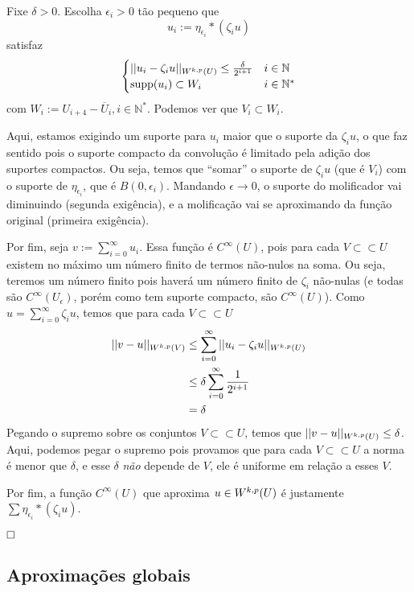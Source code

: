 \documentclass[a4paper, 11pt]{article}
\newcommand{\qed}{$\hfill\square$}
\newcommand{\N}{\mathbb{N}}
\newcommand{\e}{\epsilon}
\begin{document}
Fixe \( \delta>0\). Escolha \( \e_i>0 \) tão pequeno que \[ u_i := \eta_{\e_i} * \left(\zeta_iu\right) \] satisfaz \[ \begin{cases}
	||u_i - \zeta_iu||_{\sobolevdef} \leq \frac{\delta}{2^{i+1}} & i \in \N \\
	\text{supp}(u_i) \subset W_i & i \in \N^*
\end{cases} \] com \( W_i := U_{i+4} - \overline{U}_i, i \in \N^* \). Podemos ver que \( V_i \subset W_i \). 

Aqui, estamos exigindo um suporte para \( u_i \) maior que o suporte da \( \zeta_iu \), o que faz sentido pois o suporte compacto da convolução é limitado pela adição dos suportes compactos. Ou seja, temos que ``somar'' o suporte de \( \zeta_iu \) (que é \( V_i \)) com o suporte de \( \eta_{\e_i} \), que é \( B(0, \e_i) \). Mandando \( \e\rightarrow 0 \), o suporte do molificador vai diminuindo (segunda exigência), e a molificação vai se aproximando da função original (primeira exigência).

Por fim, seja $ v:=\sum_{i=0}^{\infty} u_i $. Essa função é \( C^\infty(U) \), pois para cada \( V \subset\subset U \) existem no máximo um número finito de termos não-nulos na soma. Ou seja, teremos um número finito pois haverá um número finito de \( \zeta_i \) não-nulas (e todas são \( C^\infty (U_\e) \), porém como tem suporte compacto, são \( C^\infty(U) \)). Como \( u=\sum_{i=0}^{\infty}\zeta_iu  \), temos que para cada \( V \subset\subset U \) 
\begin{align*}
	||v - u||_{W^{k,p}(V)} &\leq \sum_{i=0}^{\infty} ||u_i - \zeta_iu||_{W^{k,p}(U)} \\
	&\leq \delta  \sum_{i=0}^{\infty}  \frac{1}{2^{i+1}}\\
	&= \delta
\end{align*} Pegando o supremo sobre os conjuntos \( V \subset\subset U \), temos que \( ||v-u||_{W^{k,p}(U)} \leq \delta \). Aqui, podemos pegar o supremo pois provamos que para cada \( V \subset\subset U \) a norma é menor que \( \delta \), e esse \( \delta \) \textit{não} depende de \( V \), ele é uniforme em relação a esses \( V \).

Por fim, a função \( C^{\infty}(U) \) que aproxima \( u \in W^{k,p}(U) \) é justamente \( \sum \eta_{\e_i} * (\zeta_i u) \).

\qed




\subsection{Aproximações globais}
\end{document}
